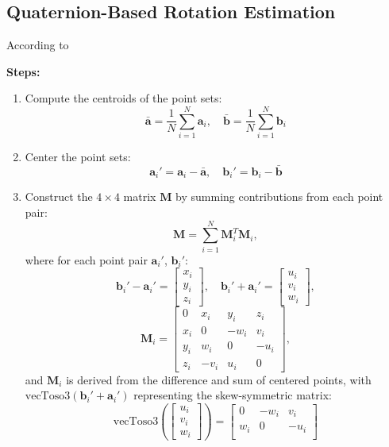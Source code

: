 \documentclass[english,10pt,a4paper]{book}
\begin{document}
    \subsection*{Quaternion-Based Rotation Estimation}
    According to \cite{Horn}
    
    \textbf{Steps:}
    \begin{enumerate}
    	\item Compute the centroids of the point sets:
    	\[
    	\bar{\mathbf{a}} = \frac{1}{N} \sum_{i=1}^N \mathbf{a}_i, \quad \bar{\mathbf{b}} = 		\frac{1}{N} \sum_{i=1}^N \mathbf{b}_i
    	\]
    	\item Center the point sets:
    	\[
    	\mathbf{a}_i' = \mathbf{a}_i - \bar{\mathbf{a}}, \quad \mathbf{b}_i' = 			\mathbf{b}_i - \bar{\mathbf{b}}
    	\]
    	\item Construct the $4 \times 4$ matrix $\mathbf{M}$ by summing contributions from each point pair:
    	\[
    	\mathbf{M} = \sum_{i=1}^N \mathbf{M}_i^T \mathbf{M}_i,
    	\]
    	where for each point pair $\mathbf{a}_i'$, $\mathbf{b}_i'$:
    	\[
    	\mathbf{b}_i' - \mathbf{a}_i' = \begin{bmatrix} x_i \\ y_i \\ z_i \end{bmatrix}, 		\quad \mathbf{b}_i' + \mathbf{a}_i' = \begin{bmatrix} u_i \\ v_i \\ w_i \end{bmatrix},
    	\]
    	\[
    	\mathbf{M}_i = \begin{bmatrix}
    		0 & x_i & y_i & z_i \\
    		x_i & 0 & -w_i & v_i \\
    		y_i & w_i & 0 & -u_i \\
    		z_i & -v_i & u_i & 0
    	\end{bmatrix},
    	\]
    	and $\mathbf{M}_i$ is derived from the difference and sum of centered points, with $\text{vecToso3}(\mathbf{b}_i' + \mathbf{a}_i')$ representing the skew-symmetric matrix:
    	\[
    	\text{vecToso3}\left( \begin{bmatrix} u_i \\ v_i \\ w_i \end{bmatrix} \right) = 		\begin{bmatrix}
    		0 & -w_i & v_i \\
    		w_i & 0 & -u_i \\

\end{bmatrix}\]
\end{enumerate}
\end{document}
